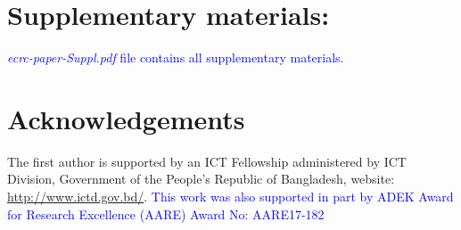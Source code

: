 \documentclass[3p,times]{elsarticle} %
\begin{document}
	
	
	
%    
%		
%		
%	
%	
	
	
%	
	
	\section*{Supplementary materials:}
	\textcolor{blue}{\textit{ecrc-paper-Suppl.pdf} file contains all supplementary materials.}
	
	\section*{Acknowledgements}
	The first author is supported by an ICT Fellowship administered by ICT Division, Government of the People's Republic of Bangladesh, website: \url{http://www.ictd.gov.bd/}. \textcolor{blue}{This work was also supported in part by ADEK Award for Research Excellence (AARE) Award
	No: AARE17-182}
	

	
	
	
	
\end{document}
